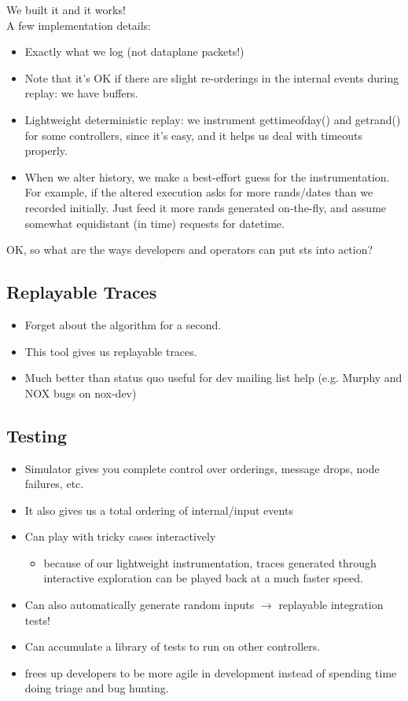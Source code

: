 We built it and it works! \\

A few implementation details:
\begin{itemize}
\item Exactly what we log (not dataplane packets!)
\item Note that it's OK if there are slight re-orderings in the internal
events during replay: we have buffers.
\item Lightweight deterministic replay: we instrument gettimeofday() and getrand() for some controllers, since it's easy, and it helps us deal with timeouts properly.
\item When we alter history, we make a best-effort guess for the
instrumentation. For example, if the altered execution asks for more rands/dates than we recorded initially. Just feed it more rands generated on-the-fly, and assume somewhat equidistant (in time) requests for datetime.
\end{itemize}

OK, so what are the ways developers and operators can put sts into action?

\subsection{Replayable Traces}
\begin{itemize}
\item Forget about the algorithm for a second.
\item This tool gives us replayable traces.
\item Much better than status quo useful for dev mailing list help (e.g. Murphy and NOX bugs on nox-dev)
\end{itemize}

\subsection{Testing}
\begin{itemize}
\item Simulator gives you complete control over orderings, message drops, node failures, etc.
\item It also gives us a total ordering of internal/input events
\item Can play with tricky cases interactively
  \begin{itemize}
  \item because of our lightweight instrumentation, traces generated through interactive exploration can be played back at a much faster speed.
  \end{itemize}

\item Can also automatically generate random inputs $\rightarrow$ replayable integration tests!
\item Can accumulate a library of tests to run on other controllers.
\item frees up developers to be more agile in development instead of spending time doing triage and bug hunting.
\end{itemize}

